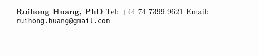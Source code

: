 \documentclass[a4paper,10pt]{article}
\begin{document}
\newcommand{\HU}[0]{Humboldt Universit\"at zu Berlin}
\fancyhf{}
\renewcommand{\headrulewidth}{0pt}
\renewcommand{\footrulewidth}{1pt}
\renewcommand\footrule{\begin{minipage}{1\textwidth}
\hrule width \hsize height 2pt \kern 1mm \hrule width \hsize   
\end{minipage}\par}
\pagestyle{fancy}
\lfoot{\monthyear\today}
\begin{tabular}[h]{p{}p{}}
 &\vspace{1pt}\large{\textbf{Ruihong Huang, PhD}\newline
  \vspace{-8pt} \newline
Tel: +44 74 7399 9621  \newline
Email: \verb|ruihong.huang@gmail.com| } \\
\end{tabular}\\
\rule[5pt]{1\textwidth}{1pt}\par
\setlength{\tabcolsep}{10pt}
\setlength{\extrarowheight}{6pt}
\end{document}
